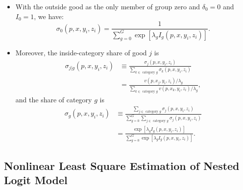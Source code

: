\documentclass[
]{book}
\providecommand{\tightlist}{%
  \setlength{\itemsep}{0pt}\setlength{\parskip}{0pt}}
\begin{document}
\begin{itemize}
\tightlist
\item
  With the outside good as the only member of group zero and \(\delta_0 = 0\) and \(I_0 = 1\), we have:
  \begin{equation}
  \sigma_{0}(p, x, y_i, z_i) = \frac{1}{\sum_{g = 0}^G \exp[\lambda_g I_{g}(p, x, y_i, z_i)]}.
  \end{equation}
\item
  Moreover, the inside-category share of good \(j\) is
  \begin{equation}
  \begin{split}
  \sigma_{j|g}(p, x, y_i, z_i) 
  &\equiv \frac{\sigma_{j}(p, x, y_i, z_i)}{\sum_{k \in \text{   category   } g} \sigma_{k}(p, x, y_i, z_i)}\\
  &= \frac{v(p, x_j, y_i, z_i)/\lambda_g}{\sum_{k \in \text{   category   } g} v(p, x_k, y_i, z_i)/\lambda_g},
  \end{split}
  \end{equation}
  and the share of category \(g\) is
  \begin{equation}
  \begin{split}
  \sigma_g(p, x, y_i, z_i) 
  &\equiv \frac{\sum_{j \in \text{   category   } g} \sigma_{j}(p, x, y_i, z_i)}{\sum_{g = 0}^G \sum_{j \in \text{   category   } g} \sigma_{j}(p, x, y_i, z_i)}\\
  &= \frac{\exp[\lambda_g I_{g}(p, x, y_i, z_i)]}{\sum_{g = 0}^G \exp[\lambda_g I_{g}(p, x, y_i, z_i)]}.
  \end{split}
  \end{equation}
\end{itemize}

\hypertarget{nonlinear-least-square-estimation-of-nested-logit-model}{%
\subsection{Nonlinear Least Square Estimation of Nested Logit Model}\label{nonlinear-least-square-estimation-of-nested-logit-model}}
\end{document}
